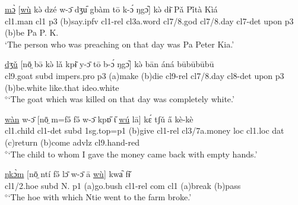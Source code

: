 \documentclass[10pt,twoside]{article}
\newcommand{\gl}[1]{`#1'}
\def\VSP{\vspace{0pt}}
\newcommand{\cl}[1]{{\sc cl#1}}
\def\elicited{$^\diamond$}
\def\ih{ɩ}
\begin{document}
\begin{exe}
	\ex \label{exThePersonWhoWasPreaching1} 		
		\gll \uline{mɔ̀} [\uline{wù} kə̀ dzé w-ɔ̄ dʒu᷇ gbàm tō k-ɔ́ ŋgɔ᷆] kə̀ dɨ̄ Pǎ Pi̋tà Kìá\\
		\cl1.man	\cl1 	{\sc p3}	({\sc b})say.{\sc ipfv}	\cl1-{\sc rel}	\cl3a.word \cl7/8.god	\cl7/8.day	\cl7-{\sc det}	 upon	{\sc p3}	({\sc b})be	Pa P. K. \\
		\glt \VSP \gl{The person who was preaching on that day was Pa Peter Kia.}
\end{exe}%
\begin{exe} 
	\ex \label{exGoatTheyKilled}	

		\gll	\uline{dʒǔ} [nō̤ bə̄ kə̀ lǎ kpɨ̄ y-ɔ̄ tō b-ɔ́ ŋgɔ᷆] kə̀ bān áná būbūbūbū			\\
			\cl9.goat {\sc subd} {\sc impers.pro} {\sc p3} ({\sc a})make ({\sc b})die \cl9-{\sc rel} \cl7/8.day \cl8-{\sc det} upon {\sc p3} ({\sc b})be.white like.that {\sc ideo}.white		\\
		\glt \VSP \elicited \gl{The goat which was killed on that day was completely white.}
\end{exe}%

\begin{exe}
	\ex \label{exChildWhomIGaveMoney}	

		\gll	\uline{wàn} w-ɔ̄ [nō̤ m=fə̋ fə̋ w-ɔ̄ kpɒ̋ {\H\ih} \uline{wú} lā] kɛ́ tʃǔ a̋ kè-kè	\\
			\cl1.child \cl1-{\sc det} {\sc subd} {\sc 1sg.top}={\sc p1} ({\sc b})give	\cl1-{\sc rel} \cl3/7a.money {\sc loc} \cl1.{\sc loc} {\sc dat} ({\sc c})return ({\sc b})come {\sc advlz} \cl9.hand-{\sc red} 				\\
		\glt \VSP \elicited \gl{The child to whom I gave the money came back with empty hands.}

\end{exe}%

\begin{exe}
	\ex \label{exTheHoeWithWhich}	
		\gll	\uline{ŋkɔ̀m} [nō̤ ntí fə̋ lɔ̄ w-ɔ̄ ā \uline{wù}] kwa᷆ fɨ̌  	\\
			\cl1/2.hoe {\sc subd} N. {\sc p1} ({\sc a})go.bush	\cl1-{\sc rel} {\sc com} \cl1 ({\sc a})break ({\sc b})pass 				\\
		\glt \VSP \elicited \gl{The hoe with which Ntie went to the farm broke.}
\end{exe}
\end{document}
